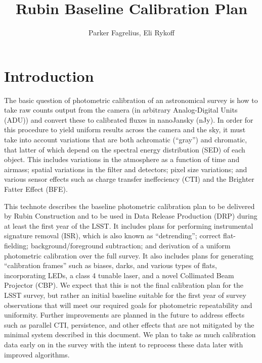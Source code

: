 \documentclass[SE,authoryear,lsstdraft,toc]{lsstdoc}
\title{Rubin Baseline Calibration Plan}
\author{%
Parker Fagrelius, Eli Rykoff
}
\date{\vcsDate}
\begin{document}
\maketitle


\section{Introduction}

The basic question of photometric calibration of an astronomical survey is how
to take raw counts output from the camera (in arbitrary Analog-Digital Units
(ADU)) and convert these to calibrated fluxes in nanoJansky (nJy).  In order
for this procedure to yield uniform results across the camera and the sky, it
must take into account variations that are both achromatic (``gray'') and
chromatic, that latter of which depend on the spectral energy distribution (SED) of each
object.  This includes variations in the atmosphere as a function of time and
airmass; spatial variations in the filter and detectors; pixel size variations;
and various sensor effects such as charge transfer ineffeciency (CTI) and the
Brighter Fatter Effect (BFE).

This technote describes the baseline photometric calibration plan to be
delivered by Rubin Construction and to be used in Data Release Production (DRP)
during at least the first year of the LSST.  It includes plans for performing
instrumental signature removal (ISR), which is also known as ``detrending'';
correct flat-fielding; background/foreground subtraction; and derivation of a
uniform photometric calibration over the full survey.  It also includes plans
for generating ``calibration frames'' such as biases, darks, and various types
of flats, incorporating LEDs, a class 4 tunable laser, and a novel Collimated
Beam Projector (CBP).  We expect that this is not the final calibration plan
for the LSST survey, but rather an initial baseline suitable for the first year
of survey observations that will meet our required goals for photometric
repeatability and uniformity.  Further improvements are planned in the future
to address effects such as parallel CTI, persistence, and other effects that
are not mitigated by the minimal system described in this document. We plan to
take as much calibration data early on in the survey with the intent to
reprocess these data later with improved algorithms.
\end{document}
